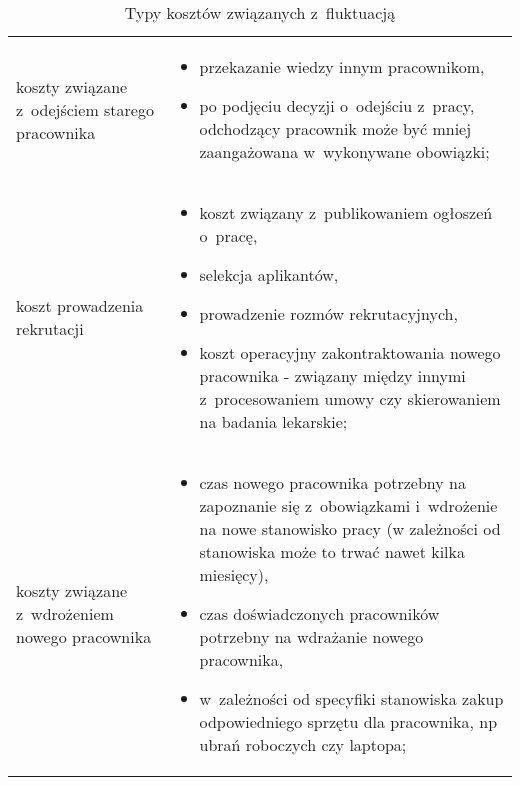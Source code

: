 \noindent\begin{minipage}{\textwidth}
             \begin{table}[H]
                 \raggedright\caption{Typy kosztów związanych z~fluktuacją\label{tabela:fluktuacja-koszty}}
                 \begin{center}
                     \begin{tabular}{|P{.15\textwidth}|P{.75\textwidth}|}

                         \hline
                          &
                          \\
                         \hline

                         koszty związane z~odejściem starego pracownika &
                         \begin{itemize}
                             \item przekazanie wiedzy innym pracownikom,
                             \item po podjęciu decyzji o~odejściu z~pracy, odchodzący pracownik może być mniej zaangażowana w~wykonywane obowiązki;
                         \end{itemize} \\

                         \hline

                         koszt prowadzenia rekrutacji &
                         \begin{itemize}
                             \item koszt związany z~publikowaniem ogłoszeń o~pracę,
                             \item selekcja aplikantów,
                             \item prowadzenie rozmów rekrutacyjnych,
                             \item koszt operacyjny zakontraktowania nowego pracownika - związany między innymi z~procesowaniem umowy czy skierowaniem na badania lekarskie;
                         \end{itemize} \\
                         \hline

                         koszty związane z~wdrożeniem nowego pracownika &
                         \begin{itemize}
                             \item czas nowego pracownika potrzebny na zapoznanie się z~obowiązkami i~wdrożenie na nowe stanowisko pracy (w zależności od stanowiska może to trwać nawet kilka miesięcy),
                             \item czas doświadczonych pracowników potrzebny na wdrażanie nowego pracownika,
                             \item w~zależności od specyfiki stanowiska zakup odpowiedniego sprzętu dla pracownika, np ubrań roboczych czy laptopa;
                         \end{itemize} \\
                         \hline


\end{tabular}
\end{center}
\end{table}
\end{minipage}
